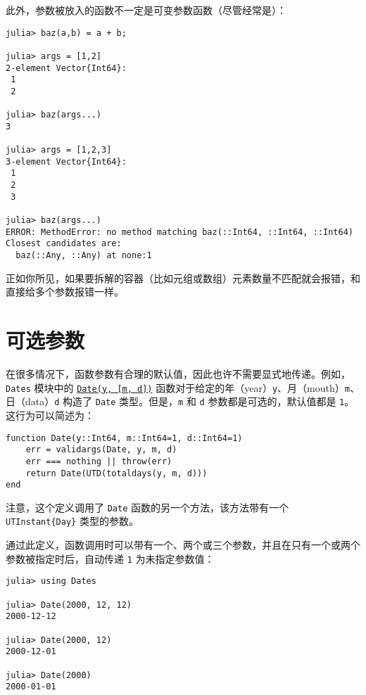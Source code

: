 此外，参数被放入的函数不一定是可变参数函数（尽管经常是）：




\begin{verbatim}
julia> baz(a,b) = a + b;

julia> args = [1,2]
2-element Vector{Int64}:
 1
 2

julia> baz(args...)
3

julia> args = [1,2,3]
3-element Vector{Int64}:
 1
 2
 3

julia> baz(args...)
ERROR: MethodError: no method matching baz(::Int64, ::Int64, ::Int64)
Closest candidates are:
  baz(::Any, ::Any) at none:1
\end{verbatim}



正如你所见，如果要拆解的容器（比如元组或数组）元素数量不匹配就会报错，和直接给多个参数报错一样。



\hypertarget{16207703858977287144}{}


\section{可选参数}



在很多情况下，函数参数有合理的默认值，因此也许不需要显式地传递。例如，\texttt{Dates} 模块中的 \hyperlink{4488183467971164548}{\texttt{Date(y, [m, d])}} 函数对于给定的年（year）\texttt{y}、月（mouth）\texttt{m}、日（data）\texttt{d} 构造了 \texttt{Date} 类型。但是，\texttt{m} 和 \texttt{d} 参数都是可选的，默认值都是 \texttt{1}。这行为可以简述为：




\begin{verbatim}
function Date(y::Int64, m::Int64=1, d::Int64=1)
    err = validargs(Date, y, m, d)
    err === nothing || throw(err)
    return Date(UTD(totaldays(y, m, d)))
end
\end{verbatim}



注意，这个定义调用了 \texttt{Date} 函数的另一个方法，该方法带有一个 \texttt{UTInstant\{Day\}} 类型的参数。



通过此定义，函数调用时可以带有一个、两个或三个参数，并且在只有一个或两个参数被指定时后，自动传递 \texttt{1} 为未指定参数值：




\begin{verbatim}
julia> using Dates

julia> Date(2000, 12, 12)
2000-12-12

julia> Date(2000, 12)
2000-12-01

julia> Date(2000)
2000-01-01
\end{verbatim}



